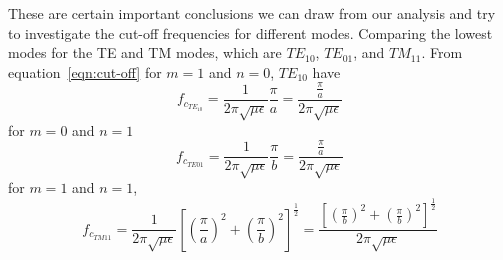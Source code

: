 These are certain important conclusions we can draw from our analysis and try to investigate the cut-off frequencies for different modes. Comparing the lowest modes for the TE and TM modes, which are $TE_{10}$, $TE_{01}$, and $TM_{11}$.
From equation~\ref{eqn:cut-off} for  $m=1$ and $n=0$, $TE_{10}$ have 
\begin{dmath*}
f_{c_{TE_{10}}} = \frac{1}{2\pi \sqrt{\mu\epsilon}}\frac{\pi}{a} = \frac{\frac{\pi}{a}}{2\pi \sqrt{\mu\epsilon}}
\end{dmath*}
for $m=0$ and $n=1$
\begin{dmath*}
f_{c_{TE{01}}} = \frac{1}{2\pi \sqrt{\mu\epsilon}}\frac{\pi}{b} = \frac{\frac{\pi}{a}}{2\pi \sqrt{\mu\epsilon}}
\end{dmath*}
for $m=1$ and $n=1$, 
\begin{dmath*} 
f_{c_{TM{11}}} = \frac{1}{2\pi \sqrt{\mu\epsilon}}\left[\left(\frac{\pi}{a}\right)^2 + \left(\dfrac{\pi}{b}\right)^2\right]^{\frac{1}{2}} = \frac{\left[\left(\frac{\pi}{b}\right)^2 + \left(\frac{\pi}{b}\right)^2\right]^{\frac{1}{2}}}{2\pi \sqrt{\mu\epsilon}}
\end{dmath*}

